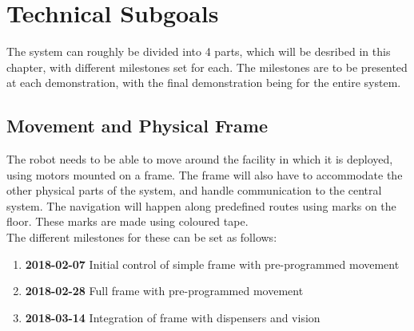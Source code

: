 \documentclass[a4paper,10pt,DIV10,openright,openbib]{scrreprt}
\begin{document}
\section{Technical Subgoals}
The system can roughly be divided into 4 parts, which will be desribed in this chapter, with different milestones set for each. The milestones are to be
presented at each demonstration, with the final demonstration being for the entire
system.

\subsection{Movement and Physical Frame}
The robot needs to be able to move around the facility in which it is deployed, using
motors mounted on a frame. The frame will also have to accommodate the other
physical parts of the system, and handle communication to the central system. 
The navigation will happen along predefined routes using marks on the floor. 
These marks are made using coloured tape.\\
The different milestones for these can be set as follows:
\begin{enumerate}
  \item \textbf{2018-02-07} Initial control of simple frame with pre-programmed movement
  \item \textbf{2018-02-28} Full frame with pre-programmed movement
  \item \textbf{2018-03-14} Integration of frame with dispensers and vision
\end{enumerate}
\end{document}
